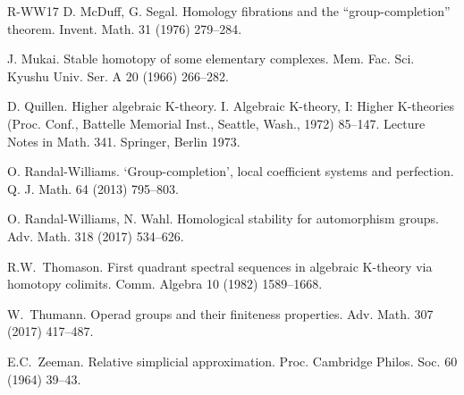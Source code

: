 \begin{thebibliography}{R-WW17}
 D. McDuff, G. Segal. Homology fibrations and the ``group-completion'' theorem. Invent. Math. 31 (1976) 279--284.  

 J. Mukai. Stable homotopy of some elementary complexes. Mem. Fac. Sci. Kyushu Univ. Ser. A 20 (1966) 266--282.

 D. Quillen. Higher algebraic K-theory. I. Algebraic K-theory, I: Higher K-theories (Proc. Conf., Battelle Memorial Inst., Seattle, Wash., 1972) 85--147. Lecture Notes in Math. 341. Springer, Berlin 1973. 

 O. Randal-Williams. `Group-completion', local coefficient systems and perfection. Q. J. Math. 64 (2013) 795--803.

 O. Randal-Williams, N. Wahl. Homological stability for automorphism groups. Adv. Math. 318 (2017) 534--626.


 R.W.~Thomason. First quadrant spectral sequences in algebraic K-theory via homotopy colimits. Comm. Algebra 10 (1982) 1589--1668.

 W.~Thumann. Operad groups and their finiteness properties. Adv. Math. 307 (2017) 417--487. 

 E.C.~Zeeman. Relative simplicial approximation. Proc. Cambridge Philos. Soc. 60 (1964) 39--43. 

\end{thebibliography}
